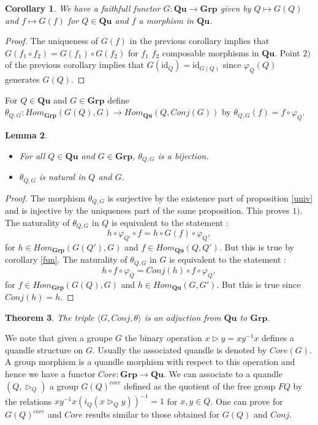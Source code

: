 \documentclass[12pt, reqno]{amsart}
\newtheorem{theorem}{Theorem}[section]
\newtheorem{corollary}[theorem]{Corollary}
\newtheorem{lemma}[theorem]{Lemma}
\newcommand{\Q}{{\mathbf{Qu}}}
\newcommand{\G}{{\mathbf{Grp}}}
\begin{document}
\begin{corollary}\label{fund}
We have a faithfull functor $G: \Q \to \G$ given by $Q\mapsto G(Q)$ and $f\mapsto G(f)$ for $Q\in \Q$ and $f$ a morphism in $\Q$.
\end{corollary}
\begin{proof}
The uniqueness of $G(f)$ in the previous corollary implies that $G(f_1\circ f_2)=G(f_1)\circ G(f_2)$ for $f_1$ $f_2$ composable morphisms in $\Q$. Point $2)$ of the previous corollary implies that $G(\mathrm{id}_Q)=\mathrm{id}_{G(Q)}$ since $\varphi_Q(Q)$ generates $G(Q)$.
\end{proof}
For $Q \in \Q$ and $G \in \G$ define $\theta_{Q,G}: Hom_\G(G(Q),G) \to Hom_\Q(Q,Conj(G))$ by $\theta_{Q,G}(f)=f\circ \varphi_Q$.
\begin{lemma}
\begin{itemize}
\item[1)] For all $Q\in \Q$ and $G\in\G$, $\theta_{Q,G}$ is a bijection.
\item[2)] $\theta_{Q,G}$ is natural in $Q$ and $G$.
\end{itemize}
\end{lemma}
\begin{proof}
 The morphism $\theta_{Q,G}$ is surjective by the existence part of proposition \ref{univ} and is injective by the uniqueness part of the same proposition. This proves $1)$. The naturality of $\theta_{Q,G}$ in $Q$ is equivalent to the statement :
$$ h\circ \varphi_{Q'} \circ f=h\circ G(f) \circ \varphi_Q,$$
for $h\in Hom_\G(G(Q'),G)$ and $f\in Hom_\Q(Q,Q')$. But this is true by corollary \ref{fun}.
 The naturality of $\theta_{Q,G}$ in $G$ is equivalent to the statement :
$$ h \circ f \circ \varphi_Q=Conj(h)\circ f \circ \varphi_Q,$$
for $f\in Hom_\G(G(Q),G)$ and $h\in Hom_\Q(G,G')$. But this is true since $Conj(h)=h$.
\end{proof}
\begin{theorem}
The triple $\langle G, Conj, \theta \rangle$ is an adjuction from $\Q$ to $\G$.
\end{theorem}
We note that given a groupe $G$ the binary operation $x\triangleright y=xy^{-1}x$ defines a quandle structure on $G$. Usually the associated quandle is denoted by $Core(G)$. A group morphism is a quandle morphism with respect to this operation and hence we have a functor $Core : \G \to \Q$. We can associate to a quandle $(Q,\triangleright_Q)$ a group $G(Q)^{core}$ defined as the quotient of the free group $FQ$ by the relations $xy^{-1}x(i_Q(x\triangleright_Q y))^{-1}=1$ for $x,y\in Q$. One can prove for $G(Q)^{core}$ and $Core$ results similar to those obtained for $G(Q)$ and $Conj$.\\
\end{document}
